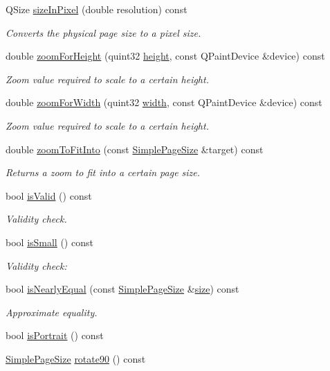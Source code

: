\begin{DoxyCompactItemize}
Q\+Size \hyperlink{classSimplePageSize_a079b0629a665687b0895a0d33ee57226}{size\+In\+Pixel} (double resolution) const 
\begin{DoxyCompactList}\small\item\em Converts the physical page size to a pixel size. \end{DoxyCompactList}\item 
double \hyperlink{classSimplePageSize_a7e7d0fc6deee155ef09d2efeb0dfa3dd}{zoom\+For\+Height} (quint32 \hyperlink{classSimplePageSize_a8df6b43628bff9c8b53f26cc478640c5}{height}, const Q\+Paint\+Device \&device) const 
\begin{DoxyCompactList}\small\item\em Zoom value required to scale to a certain height. \end{DoxyCompactList}\item 
double \hyperlink{classSimplePageSize_a269ac3d06b412cd6e55603acebf7df12}{zoom\+For\+Width} (quint32 \hyperlink{classSimplePageSize_a5866f4c04635b09ec065a1fc45f9d1df}{width}, const Q\+Paint\+Device \&device) const 
\begin{DoxyCompactList}\small\item\em Zoom value required to scale to a certain height. \end{DoxyCompactList}\item 
double \hyperlink{classSimplePageSize_a7e8824e03d04f5e8dea834c4decd85a5}{zoom\+To\+Fit\+Into} (const \hyperlink{classSimplePageSize}{Simple\+Page\+Size} \&target) const 
\begin{DoxyCompactList}\small\item\em Returns a zoom to fit into a certain page size. \end{DoxyCompactList}\item 
bool \hyperlink{classSimplePageSize_acc614937770417e54201cac058ed19be}{is\+Valid} () const 
\begin{DoxyCompactList}\small\item\em Validity check. \end{DoxyCompactList}\item 
bool \hyperlink{classSimplePageSize_a593f0284c950b6a71bdce5c6751f30f4}{is\+Small} () const 
\begin{DoxyCompactList}\small\item\em Validity check\+: \end{DoxyCompactList}\item 
bool \hyperlink{classSimplePageSize_acb4b951dcef3b5b94e2c6d1942e833e6}{is\+Nearly\+Equal} (const \hyperlink{classSimplePageSize}{Simple\+Page\+Size} \&\hyperlink{synctex__parser_8c_aa23c661441688350614bd6a350d2b6ff}{size}) const 
\begin{DoxyCompactList}\small\item\em Approximate equality. \end{DoxyCompactList}\item 
bool \hyperlink{classSimplePageSize_ac17b6a4d3469e011c014d042bffafb0b}{is\+Portrait} () const 
\item 
\hyperlink{classSimplePageSize}{Simple\+Page\+Size} \hyperlink{classSimplePageSize_afcb2dd4b6838439c96a92838cd90507e}{rotate90} () const 
\end{DoxyCompactItemize}
